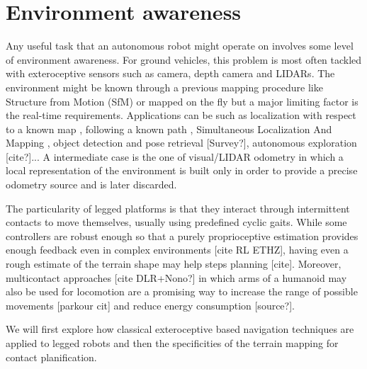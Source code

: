 \section{Environment awareness}
Any useful task that an autonomous robot might operate on involves some level of environment awareness. For ground vehicles, 
this problem is most often tackled with exteroceptive sensors such as camera, depth camera and LIDARs.
The environment might be known through a previous mapping procedure like Structure from Motion (SfM) \cite{triggs1999bundle} or mapped on the fly but a major limiting 
factor is the real-time requirements. Applications can be such as localization with respect to a known map \cite{dellaert1999monte},
following a known path \cite{furgale2010visual}, Simultaneous Localization And Mapping \cite{aulinas2008slam, cadena2016past}, object detection and pose retrieval [Survey?], 
autonomous exploration [cite?]... A intermediate case is the one of visual/LIDAR odometry in which a local representation of the environment is built
only in order to provide a precise odometry source \cite{scaramuzza2011visual} and is later discarded. 

The particularity of legged platforms is that they interact through intermittent contacts to move themselves, usually using predefined cyclic gaits. While some controllers are 
robust enough so that a purely proprioceptive estimation provides enough feedback even in complex environments [cite RL ETHZ], having even a rough estimate of 
the terrain shape may help steps planning [cite]. Moreover, multicontact approaches \cite{carpentier2017multi} [cite DLR+Nono?] in which arms of a humanoid may also be used 
for locomotion are a promising way to increase the range of possible movements [parkour cit] and reduce energy consumption [source?]. 

We will first explore how classical exteroceptive based navigation techniques are applied to legged robots and then the specificities of the 
terrain mapping for contact planification.

